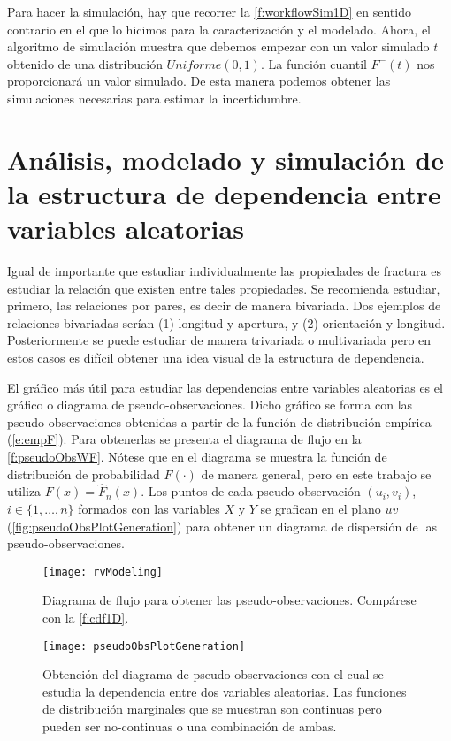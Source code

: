 Para hacer la simulaci\'on, hay que recorrer la \autoref{f:workflowSim1D} en sentido contrario en el que lo hicimos para la caracterizaci\'on y el modelado. Ahora, el algoritmo de simulaci\'on muestra que debemos empezar con un valor simulado $t$ obtenido de una distribuci\'on $Uniforme(0,1)$. La funci\'on cuantil $F^-(t)$ nos proporcionar\'a un valor simulado. De esta manera podemos obtener las simulaciones necesarias para estimar la incertidumbre.

\section{An\'alisis, modelado y simulaci\'on de la estructura de dependencia entre variables aleatorias}

Igual de importante que estudiar individualmente las propiedades de fractura es estudiar la relaci\'on que existen entre tales propiedades. Se recomienda estudiar, primero, las relaciones por pares, es decir de manera bivariada. Dos ejemplos de relaciones bivariadas ser\'ian (1) longitud y apertura, y (2) orientaci\'on y longitud. Posteriormente se puede estudiar de manera trivariada o multivariada pero en estos casos es dif\'icil obtener una idea visual de la estructura de dependencia.

El gr\'afico m\'as \'util para estudiar las dependencias entre variables aleatorias es el gr\'afico o diagrama de pseudo-observaciones. Dicho gr\'afico se forma con las pseudo-observaciones obtenidas a partir de la funci\'on de distribuci\'on emp\'irica (\autoref{e:empF}). Para obtenerlas se presenta el diagrama de flujo en la \autoref{f:pseudoObsWF}. N\'otese que en el diagrama se muestra la funci\'on de distribuci\'on de probabilidad $F(\cdot)$ de manera general, pero en este trabajo se utiliza $F(x)=\hat{F}_n(x)$. Los puntos de cada pseudo-observaci\'on $(u_i, v_i)$, $i \in \{1, \ldots, n\}$ formados con las variables $X$ y $Y$ se grafican en el plano $uv$ (\autoref{fig:pseudoObsPlotGeneration}) para obtener un diagrama de dispersi\'on de las pseudo-observaciones.

\begin{figure}
	\centering
	\texttt{[image: rvModeling]}
	\caption{Diagrama de flujo para obtener las pseudo-observaciones. Comp\'arese con la \autoref{f:cdf1D}.}
\label{f:pseudoObsWF}
\end{figure}


\begin{figure}
	\centering
	\texttt{[image: pseudoObsPlotGeneration]}
	\caption{Obtenci\'on del diagrama de pseudo-observaciones con el cual se estudia la dependencia entre dos variables aleatorias. Las funciones de distribuci\'on marginales que se muestran son continuas pero pueden ser no-continuas o una combinaci\'on de ambas.}
	\label{fig:pseudoObsPlotGeneration}
\end{figure}

